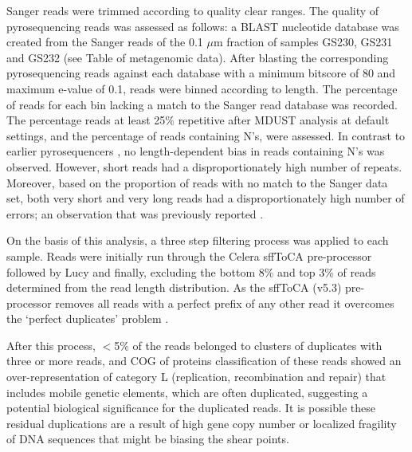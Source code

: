 Sanger reads were trimmed according to quality clear ranges.
The quality of pyrosequencing reads was assessed as follows: 
a \ac{BLAST} nucleotide database was created from the Sanger reads of the 0.1 $\mu$m fraction of samples GS230, GS231 and GS232 (see Table of metagenomic data). %
After blasting the corresponding pyrosequencing reads against each database with a minimum bitscore of 80 and maximum e-value of 0.1, reads were binned according to length.
The percentage of reads for each bin lacking a match to the Sanger read database was recorded. 
The percentage reads at least 25\% repetitive after MDUST \cite{Morgulis2006} analysis at default settings, and the percentage of reads containing N's, were assessed. 
In contrast to earlier pyrosequencers \cite{Huse2007}, no length-dependent bias in reads containing N's was observed. 
However, short reads had a disproportionately high number of repeats. 
Moreover, based on the proportion of reads with no match to the Sanger data set, both very short and very long reads had a disproportionately high number of errors; an observation that was previously reported \cite{Huse2007}.

On the basis of this analysis, a three step filtering process was applied to each sample. 
Reads were initially run through the Celera sffToCA \cite{Miller2008} pre-processor followed by Lucy \cite{Chou2001} and finally, excluding the bottom 8\% and top 3\% of reads determined from the read length distribution. 
As the sffToCA (v5.3) pre-processor removes all reads with a perfect prefix of any other read it overcomes the `perfect duplicates’ problem \cite{Gomez-Alvarez2009}.
 
After this process, $<$5\% of the reads belonged to clusters of duplicates with three or more reads, and \ac{COG} of proteins classification of these reads showed an over-representation of category L (replication, recombination and repair) that includes mobile genetic elements, which are often duplicated, suggesting a potential biological significance for the duplicated reads. 
It is possible these residual duplications are a result of high gene copy number or localized fragility of DNA sequences that might be biasing the shear points.

